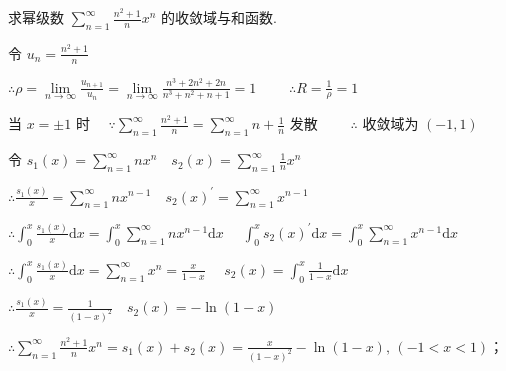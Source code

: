 \begin{problem}[points = 7]
求幂级数 $\sum\limits_{n = 1}^{\infty} \frac{n^2 + 1}{n}x^n$ 的收敛域与和函数.
\end{problem}
\begin{solution}
    令 $u_n = \frac{n^2 + 1}{n}$

    $\therefore \rho = \lim\limits_{n \to \infty} \frac{u_{n + 1}}{u_n} = \lim\limits_{n \to \infty} \frac{n^3 + 2n^2 + 2n}{n^3 + n^2 + n + 1} = 1 \qquad$
    $\therefore R = \frac{1}{\rho} = 1$

    当 $x = \pm 1$ 时 $\quad \because \sum\limits_{n = 1}^{\infty} \frac{n^2 + 1}{n} = \sum\limits_{n = 1}^{\infty} n + \frac{1}{n}$ 发散
    $\qquad \therefore$ 收敛域为 $(-1, 1)$

    令 $s_1(x) = \sum\limits_{n = 1}^{\infty} nx^n \quad s_2(x) = \sum\limits_{n = 1}^{\infty} \frac{1}{n}x^n$

    $\therefore \frac{s_1(x)}{x} = \sum\limits_{n = 1}^{\infty} nx^{n - 1} \quad s_2(x)^{\prime} = \sum\limits_{n = 1}^{\infty} x^{n - 1}$

    $\therefore \int_0^x \frac{s_1(x)}{x}\mathrm{d}x = \int_0^x \sum\limits_{n = 1}^{\infty} nx^{n - 1}\mathrm{d}x \quad$
    $\int_0^x s_2(x)^{\prime}\mathrm{d}x = \int_0^x \sum\limits_{n = 1}^{\infty} x^{n - 1}\mathrm{d}x$

    $\therefore \int_0^x \frac{s_1(x)}{x}\mathrm{d}x = \sum\limits_{n = 1}^{\infty} x^n = \frac{x}{1 - x} \quad$
    $s_2(x) = \int_0^x \frac{1}{1 - x}\mathrm{d}x$

    $\therefore \frac{s_1(x)}{x} = \frac{1}{(1 - x)^2} \quad s_2(x) = -\ln{(1 - x)}$

    $\therefore \sum\limits_{n = 1}^{\infty} \frac{n^2 + 1}{n}x^n = s_1(x) + s_2(x) = \frac{x}{(1 - x)^2} - \ln{(1 - x)} ,\, (-1 < x < 1)$；
\end{solution}

